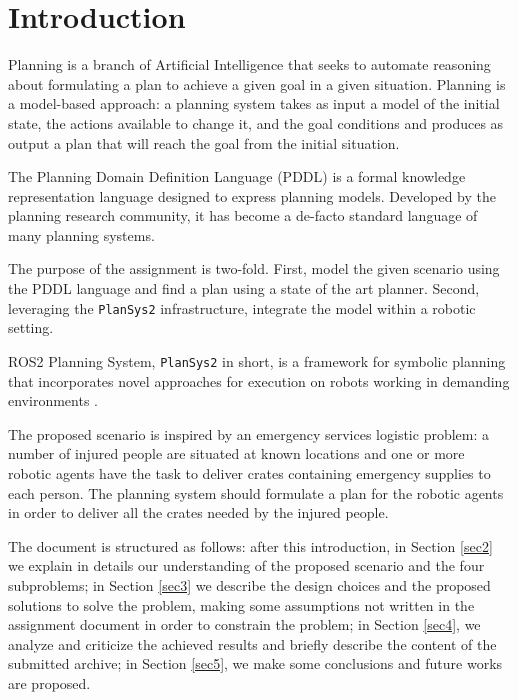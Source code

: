 \section{Introduction}
Planning is a branch of Artificial Intelligence that seeks to automate reasoning about
formulating a plan to achieve a given goal in a given situation. 
Planning is a model-based approach: a planning system takes as input a model of the initial state, 
the actions available to change it, and the goal conditions and produces as output a plan 
that will reach the goal from the initial situation.

The Planning Domain Definition Language (PDDL) is a formal knowledge representation language 
designed to express planning models. Developed by the planning research community, 
it has become a de-facto standard language of many planning systems.

The purpose of the assignment is two-fold. First, model the given scenario using the PDDL language 
and find a plan using a state of the art planner. Second, leveraging the \texttt{PlanSys2} \cite{PlanSys2} 
infrastructure, integrate the model within a robotic setting.

ROS2 Planning System, \texttt{PlanSys2} in short, is a framework for symbolic planning that incorporates 
novel approaches for execution on robots working in demanding environments \cite{PlanSys2}.

The proposed scenario \cite{assignment} is inspired by an emergency services logistic problem:
a number of injured people are situated at known locations and one or more robotic agents
have the task to deliver crates containing emergency supplies to each person. 
The planning system should formulate a plan for the robotic agents in order to deliver all
the crates needed by the injured people.

The document is structured as follows: after this introduction, in Section \ref{sec2} 
we explain in details our understanding of the proposed scenario and the four subproblems; 
in Section \ref{sec3} we describe the design choices and the proposed solutions to solve the problem,
making some assumptions not written in the assignment document in order to constrain the problem; %
in Section \ref{sec4}, we analyze and criticize the achieved results and briefly describe the
content of the submitted archive; in Section \ref{sec5}, we make some conclusions and future 
works are proposed.


